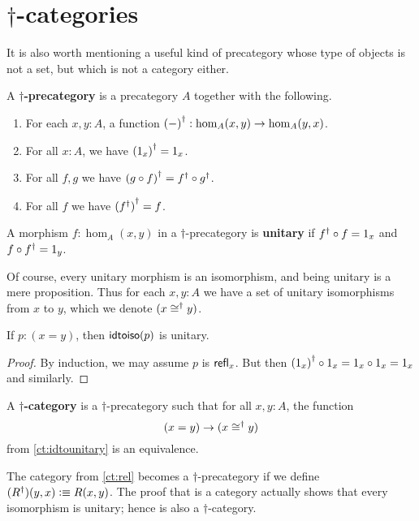 \section{$\dagger$-categories}
\label{sec:dagger-categories}

It is also worth mentioning a useful kind of precategory whose type of objects is not a set, but which is not a category either.

\begin{defn}
  A \textbf{$\dagger$-precategory} is a precategory $A$ together with the following.
  \begin{enumerate}
  \item For each $x,y:A$, a function ${(-)}^{\dagger}:\hom_A(x,y) \to \hom_A(y,x)$.
  \item For all $x:A$, we have ${(1_x)}^{\dagger} = 1_x$.
  \item For all $f,g$ we have ${(g\circ f)}^{\dagger} = {f}^{\dagger} \circ {g}^{\dagger}$.
  \item For all $f$ we have ${({f}^{\dagger})}^{\dagger} = f$.
  \end{enumerate}
\end{defn}

\begin{defn}
  A morphism $f:\hom_A(x,y)$ in a $\dagger$-precategory is \textbf{unitary} if ${f}^{\dagger} \circ f = 1_x$ and $f\circ {f}^{\dagger} = 1_y$.
\end{defn}

Of course, every unitary morphism is an isomorphism, and being unitary is a mere proposition.
Thus for each $x,y:A$ we have a set of unitary isomorphisms from $x$ to $y$, which we denote $(x\mathrel{\cong^\dagger} y)$.

\begin{lem}\label{ct:idtounitary}
  If $p:(x=y)$, then $\mathsf{idtoiso}(p)$ is unitary.
\end{lem}
\begin{proof}
  By induction, we may assume $p$ is $\mathsf{refl}_{x}$.
  But then ${(1_x)}^{\dagger} \circ 1_x = 1_x\circ 1_x = 1_x$ and similarly.
\end{proof}

\begin{defn}
  A \textbf{$\dagger$-category} is a $\dagger$-precategory such that for all $x,y:A$, the function
  \[ (x=y) \to (x \mathrel{\cong^\dagger} y) \]
  from \autoref{ct:idtounitary} is an equivalence.
\end{defn}

\begin{eg}
  The category \urel from \autoref{ct:rel} becomes a $\dagger$-precategory if we define $({R}^{\dagger})(y,x) \vcentcolon\equiv R(x,y)$.
  The proof that \urel is a category actually shows that every isomorphism is unitary; hence \urel is also a $\dagger$-category.
\end{eg}

